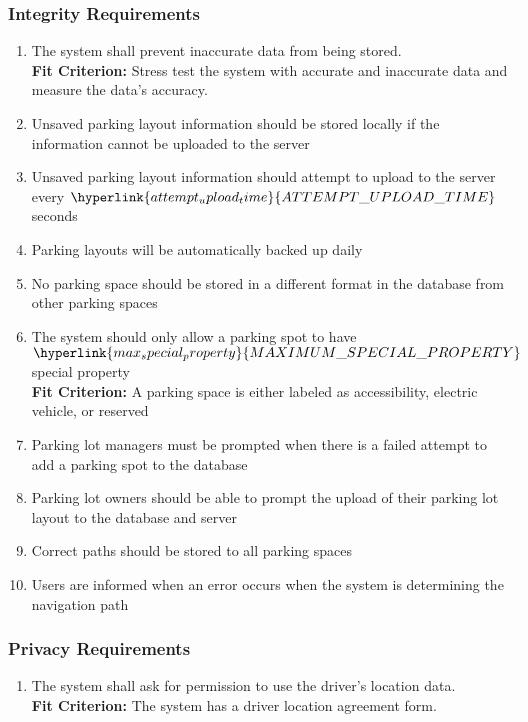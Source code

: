 \documentclass[12pt,letterpaper]{article}
\begin{document}
\subsubsection{Integrity Requirements}
\begin{enumerate}[resume*] 
    \item The system shall prevent inaccurate data from being stored.\\
    \textbf{Fit Criterion:} Stress test the system with accurate and inaccurate data and measure the data's accuracy.
    \item Unsaved parking layout information should be stored locally if the information cannot be uploaded to the server \label{isr5}
    \item Unsaved parking layout information should attempt to upload to the server every $\hyperlink{attempt_upload_time}{ATTEMPT\_UPLOAD\_TIME}$ seconds \label{isr6}
    \item Parking layouts will be automatically backed up daily \label{isr7}
    \item No parking space should be stored in a different format in the database from other parking spaces \label{isr8}
    \item The system should only allow a parking spot to have $\hyperlink{max_special_property}{MAXIMUM\_SPECIAL\_PROPERTY}$ special property \label{isr9}\\
    \textbf{Fit Criterion:} A parking space is either labeled as accessibility, electric vehicle, or reserved
    \item Parking lot managers must be prompted when there is a failed attempt to add a parking spot to the database \label{isr10}
    \item Parking lot owners should be able to prompt the upload of their parking lot layout to the database and server \label{isr11}
    \item Correct paths should be stored to all parking spaces \label{isr12}
    \item Users are informed when an error occurs when the system is determining the navigation path \label{isr13}
\end{enumerate}

\subsubsection{Privacy Requirements}
\begin{enumerate}[resume*] 
    \item The system shall ask for permission to use the driver's location data.\\
    \textbf{Fit Criterion:} The system has a driver location agreement form.
\end{enumerate}
\end{document}
